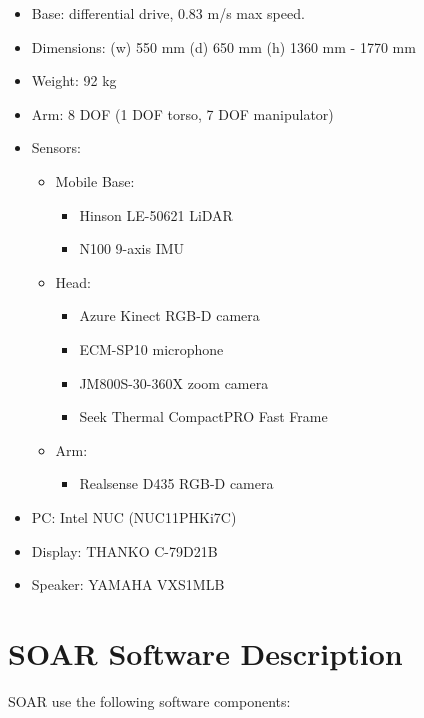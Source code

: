 \begin{itemize}
	\item Base: differential drive, 0.83 m/s max speed.
	\item Dimensions: (w) 550 mm (d) 650 mm (h) 1360 mm - 1770 mm
	\item Weight: 92 kg
	\item Arm: 8 DOF (1 DOF torso, 7 DOF manipulator)
	\item Sensors:
	      \begin{itemize}
		      \item Mobile Base:
		            \begin{itemize}
			            \item Hinson LE-50621 LiDAR
			            \item N100 9-axis IMU
		            \end{itemize}
		      \item Head:
		            \begin{itemize}
			            \item Azure Kinect RGB-D camera
			            \item ECM-SP10 microphone
			            \item JM800S-30-360X zoom camera
			            \item Seek Thermal CompactPRO Fast Frame
		            \end{itemize}
		      \item Arm:
		            \begin{itemize}
			            \item Realsense D435 RGB-D camera
		            \end{itemize}
	      \end{itemize}
	\item PC: Intel NUC (NUC11PHKi7C)
	\item Display: THANKO C-79D21B
	\item Speaker: YAMAHA VXS1MLB
\end{itemize}

\section*{SOAR Software Description}

SOAR use the following software components:

